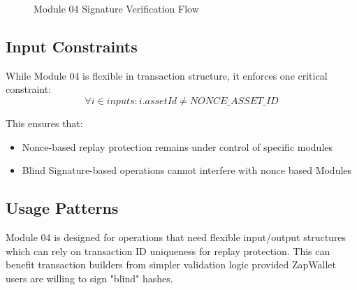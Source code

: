 \begin{figure}[H]
    \caption{Module 04 Signature Verification Flow}
    \label{fig:module04-flow}
\end{figure}







\subsection{Input Constraints}
While Module 04 is flexible in transaction structure, it enforces one critical constraint:\\

\[ \forall i \in inputs: i.assetId \neq NONCE\_ASSET\_ID \]

This ensures that:
\begin{itemize}
    \item Nonce-based replay protection remains under control of specific modules
    \item Blind Signature-based operations cannot interfere with nonce based Modules
\end{itemize}

\subsection{Usage Patterns}
Module 04 is designed for operations that need flexible input/output structures which can rely on transaction ID uniqueness
for replay protection. This can benefit transaction builders from simpler validation logic provided ZapWallet users are willing
to sign "blind" hashes.




